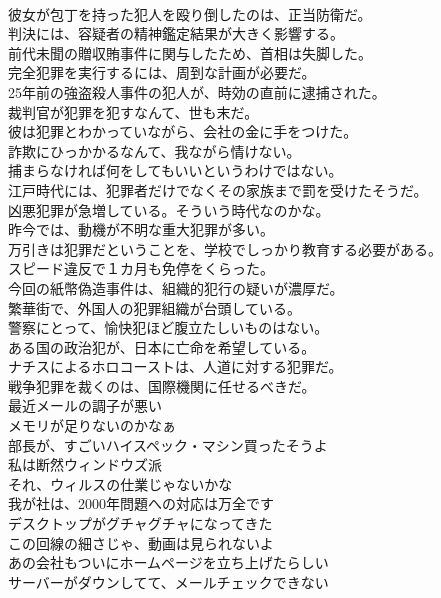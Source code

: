 \documentclass[8pt]{extreport}
\begin{document}
\begin{CJK}{UTF8}{min}
\\	彼女が包丁を持った犯人を殴り倒したのは、正当防衛だ。	
\\	判決には、容疑者の精神鑑定結果が大きく影響する。	
\\	前代未聞の贈収賄事件に関与したため、首相は失脚した。	
\\	完全犯罪を実行するには、周到な計画が必要だ。	
\\	25年前の強盗殺人事件の犯人が、時効の直前に逮捕された。	
\\	裁判官が犯罪を犯すなんて、世も末だ。	
\\	彼は犯罪とわかっていながら、会社の金に手をつけた。	
\\	詐欺にひっかかるなんて、我ながら情けない。	
\\	捕まらなければ何をしてもいいというわけではない。	
\\	江戸時代には、犯罪者だけでなくその家族まで罰を受けたそうだ。	
\\	凶悪犯罪が急増している。そういう時代なのかな。	
\\	昨今では、動機が不明な重大犯罪が多い。	
\\	万引きは犯罪だということを、学校でしっかり教育する必要がある。	
\\	スピード違反で１カ月も免停をくらった。	
\\	今回の紙幣偽造事件は、組織的犯行の疑いが濃厚だ。	
\\	繁華街で、外国人の犯罪組織が台頭している。	
\\	警察にとって、愉快犯ほど腹立たしいものはない。	
\\	ある国の政治犯が、日本に亡命を希望している。	
\\	ナチスによるホロコーストは、人道に対する犯罪だ。	
\\	戦争犯罪を裁くのは、国際機関に任せるべきだ。	
\\	最近メールの調子が悪い	
\\	メモリが足りないのかなぁ	
\\	部長が、すごいハイスペック・マシン買ったそうよ	
\\	私は断然ウィンドウズ派	
\\	それ、ウィルスの仕業じゃないかな	
\\	我が社は、2000年問題への対応は万全です	
\\	デスクトップがグチャグチャになってきた	
\\	この回線の細さじゃ、動画は見られないよ	
\\	あの会社もついにホームページを立ち上げたらしい	
\\	サーバーがダウンしてて、メールチェックできない	

\end{CJK}
\end{document}
